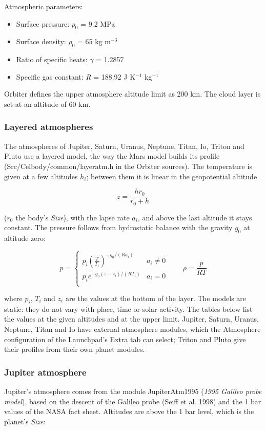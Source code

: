 \documentclass[Orbiter Developer Manual.tex]{subfiles}
\begin{document}
\noindent
Atmospheric parameters:

\begin{itemize}
\item Surface pressure: $p_{0}$ = 9.2 MPa
\item Surface density: $\rho_{0}$ = 65 kg m$^{-3}$
\item Ratio of specific heats: $\gamma$ = 1.2857
\item Specific gas constant: \textit{R} = 188.92 J K$^{-1}$ kg$^{-1}$
\end{itemize}

\noindent
Orbiter defines the upper atmosphere altitude limit as 200 km. The cloud layer is set at an altitude of 60 km.


\subsubsection{Layered atmospheres}
The atmospheres of Jupiter, Saturn, Uranus, Neptune, Titan, Io, Triton and Pluto use a layered model, the way the Mars model builds its profile (Src/Celbody/common/layeratm.h in the Orbiter sources). The temperature is given at a few altitudes $h_{i}$; between them it is linear in the geopotential altitude

\[ z = \frac{h r_{0}}{r_{0} + h} \]

\noindent
($r_{0}$ the body's \textit{Size}), with the lapse rate $a_{i}$, and above the last altitude it stays constant. The pressure follows from hydrostatic balance with the gravity $g_{0}$ at altitude zero:

\[ p =
\left\{
\begin{array}{ll}
	p_{i} \left(\frac{T}{T_{i}}\right)^{-g_{0}/(R a_{i})} & a_{i} \neq 0 \\
	p_{i} e^{-g_{0}(z - z_{i})/(R T_{i})} & a_{i} = 0 \\
\end{array}
\right.
\qquad \rho = \frac{p}{R T} \]

\noindent
where $p_{i}$, $T_{i}$ and $z_{i}$ are the values at the bottom of the layer. The models are static: they do not vary with place, time or solar activity. The tables below list the values at the given altitudes and at the upper limit. Jupiter, Saturn, Uranus, Neptune, Titan and Io have external atmosphere modules, which the Atmosphere configuration of the Launchpad's Extra tab can select; Triton and Pluto give their profiles from their own planet modules.


\subsubsection{Jupiter atmosphere}
Jupiter's atmosphere comes from the module JupiterAtm1995 (\textit{1995 Galileo probe model}), based on the descent of the Galileo probe (Seiff et al. 1998) and the 1 bar values of the NASA fact sheet. Altitudes are above the 1 bar level, which is the planet's \textit{Size}:
\end{document}
